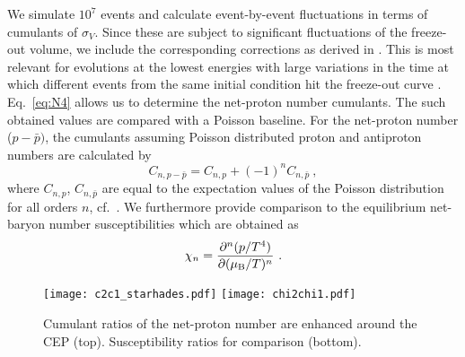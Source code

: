 \documentclass[%
 reprint,
 amsmath,amssymb,
 aps,
]{revtex4-2}
\begin{document}
We simulate $10^7$ events and calculate event-by-event fluctuations in terms of cumulants of $\sigma_V$. Since these are subject to significant fluctuations of the freeze-out volume, we include the corresponding corrections as derived in \cite{Skokov:2012ds}. This is most relevant for evolutions at the lowest energies with large variations in the time at which different events from the same initial condition hit the freeze-out curve \cite{Herold:2022tki}. Eq.~\eqref{eq:N4} allows us to determine the net-proton number cumulants. The such obtained values are compared with a Poisson baseline. For the net-proton number ($p-\bar p)$, the cumulants assuming Poisson distributed proton and antiproton numbers are calculated by
\begin{equation}
    \label{eq:poisson}
    C_{n, p-\bar p}=C_{n, p}+(-1)^n C_{n, \bar p}~,
\end{equation}
where $C_{n, p}$, $C_{n, \bar p}$ are equal to the expectation values of the Poisson distribution for all orders $n$, cf.~\cite{STAR:2021iop}. We furthermore provide comparison to the equilibrium net-baryon number susceptibilities which are obtained as
\begin{equation}
    \label{eq:susc}
    \chi_n = \frac{\partial^n (p/T^4)}{\partial(\mu_{\rm B}/T)^n}~.
\end{equation}

\begin{figure}[tbp]
\centering
\texttt{[image: c2c1\_starhades.pdf]}
\hfill
\texttt{[image: chi2chi1.pdf]}
\caption{Cumulant ratios of the net-proton number are enhanced around the CEP (top). Susceptibility ratios for comparison (bottom).}
\label{fig:c2c1}
\end{figure}
\end{document}
